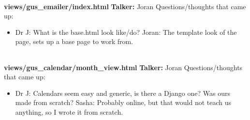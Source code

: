 \documentclass[12pt]{report}
\begin{document}
 \textbf{\\[0.5pt] views/gus\_emailer/index.html}\newline
 \textbf{Talker:} Joran\newline
 Questions/thoughts that came up:
 \begin{itemize}
  \item Dr J: What is the base.html look like/do?\newline
           Joran: The template look of the page, sets up a base page to work from.
 \end{itemize}

 \textbf{\\[0.5pt] views/gus\_calendar/month\_view.html}\newline
 \textbf{Talker:} Joran\newline
 Questions/thoughts that came up:
 \begin{itemize}
  \item Dr J: Calendars seem easy and generic, is there a Django one? Was ours made from scratch?\newline
          Sasha: Probably online, but that would not teach us anything, so I wrote it from scratch.
 \end{itemize}
\end{document}
